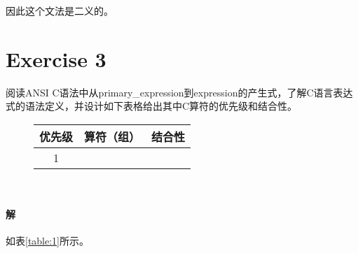 \documentclass{article}
\begin{document}
因此这个文法是二义的。
\\

\section{Exercise 3}
阅读ANSI C语法中从primary\_expression到expression的产生式，了解C语言表达式的语法定义，并设计如下表格给出其中C算符的优先级和结合性。
\FloatBarrier

\begin{figure}[H]
    \centering
    \begin{tabular}{cll}
        \hline
        \textbf{优先级} & \multicolumn{1}{c}{\textbf{算符（组）}} & \multicolumn{1}{c}{\textbf{结合性}} \\ \hline
1 &  & 
    \end{tabular}
\end{figure}

\FloatBarrier
\\
\paragraph{解}
如表\ref{table:1}所示。
\end{document}
